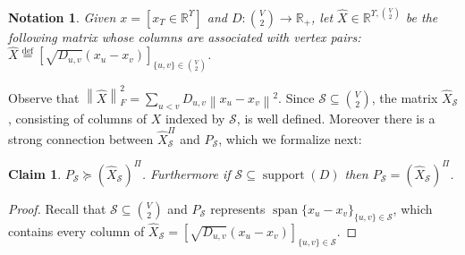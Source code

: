 \documentclass{article}
\def\triangleq{\overset{\mathrm{def}}{=}}
\newtheorem{claim}{Claim}[section]
\newtheorem{notation}{Notation}[section]
\newcommand{\R}{\mathbb{R}}
\let\proj=\Pi
\DeclareMathOperator{\spn}{span}
\DeclareMathOperator{\supp}{support}
\newcommand{\xvec}{\vec{x}} \newcommand{\yvec}{\vec{y}} \newcommand{\xmat}{\vec{X}} \newcommand{\ymat}{\vec{Y}} \newcommand{\zmat}{\vec{Z}}
\def\vec{}
\newcommand{\sde}{{\mathcal{S}}}
\begin{document}
\begin{notation} Given $\xvec=[\xvec_T \in \R^\Upsilon]$ and
  $D:\binom{V}{2} \to \R_+$, let $\widehat{\xmat} \in \R^{\Upsilon, \binom{V}{2}}$ be the following
  matrix whose columns are associated with vertex pairs:
  $\widehat{\xmat} \triangleq \left[ \sqrt{D_{u,v}} (\xvec_u-\xvec_v)
  \right]_{\{u,v\}\in \binom{V}{2}}$.
  \label{not:xmat}
\end{notation}
Observe that $\left\| \widehat{\xmat} \right\|^2_F = \sum_{u<v}
D_{u,v} \left\| \xvec_u - \xvec_v\right\|^2$.
Since $\sde \subseteq \binom{V}{2}$, the matrix
$\widehat{\xmat}_{\sde}$, consisting of columns of $\xmat$ indexed by
$\sde$, is well defined.  Moreover there is a strong connection
between $\widehat{\xmat}_{\sde}^{\proj}$ and $P_{\sde}$, which we
formalize next:
\begin{claim}
  $P_\sde \succeq {(\widehat{\xmat}_{\sde})}^{\proj}$. Furthermore if
  $\sde \subseteq \supp(D)$ then $P_\sde =
  {(\widehat{\xmat}_{\sde})}^{\proj}$.
\end{claim}
\begin{proof}
  Recall that $\sde\subseteq\binom{V}{2}$ and $P_{\sde}$ represents
  $\spn\{\xvec_u-\xvec_v\}_{\{u,v\}\in \sde}$, which contains every
  column of $\widehat{\xmat}_{\sde} = \left[ \sqrt{D_{u,v}} \left(
      \xvec_u-\xvec_v\right) \right]_{\{u,v\}\in \sde}$.
\end{proof} 
\end{document}
